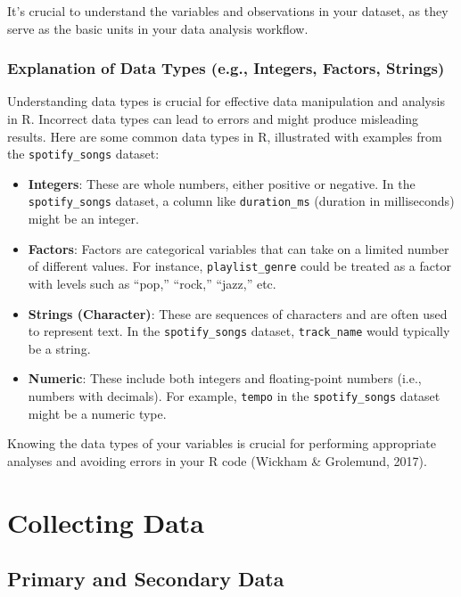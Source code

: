 \documentclass[
  b5paper]{book}
\begin{document}
It's crucial to understand the variables and observations in your dataset, as they serve as the basic units in your data analysis workflow.

\hypertarget{explanation-of-data-types-e.g.-integers-factors-strings}{%
\subsection{Explanation of Data Types (e.g., Integers, Factors, Strings)}\label{explanation-of-data-types-e.g.-integers-factors-strings}}

Understanding data types is crucial for effective data manipulation and analysis in R. Incorrect data types can lead to errors and might produce misleading results. Here are some common data types in R, illustrated with examples from the \texttt{spotify\_songs} dataset:

\begin{itemize}
\item
  \textbf{Integers}: These are whole numbers, either positive or negative. In the \texttt{spotify\_songs} dataset, a column like \texttt{duration\_ms} (duration in milliseconds) might be an integer.
\item
  \textbf{Factors}: Factors are categorical variables that can take on a limited number of different values. For instance, \texttt{playlist\_genre} could be treated as a factor with levels such as ``pop,'' ``rock,'' ``jazz,'' etc.
\item
  \textbf{Strings (Character)}: These are sequences of characters and are often used to represent text. In the \texttt{spotify\_songs} dataset, \texttt{track\_name} would typically be a string.
\item
  \textbf{Numeric}: These include both integers and floating-point numbers (i.e., numbers with decimals). For example, \texttt{tempo} in the \texttt{spotify\_songs} dataset might be a numeric type.
\end{itemize}

Knowing the data types of your variables is crucial for performing appropriate analyses and avoiding errors in your R code (Wickham \& Grolemund, 2017).

\hypertarget{collecting-data}{%
\chapter{Collecting Data}\label{collecting-data}}

\hypertarget{primary-and-secondary-data}{%
\section{Primary and Secondary Data}\label{primary-and-secondary-data}}
\end{document}
